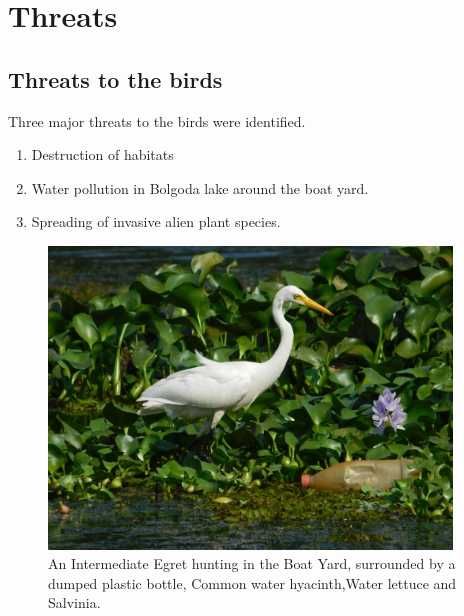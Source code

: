 \chapter{Threats}
\section{Threats to the birds}
 Three major threats  to the birds were identified.
\begin{enumerate}
    \item Destruction of habitats
    \item Water pollution in Bolgoda lake around the boat yard.
    \item Spreading of invasive alien plant species.
\end{enumerate}
\begin{figure}[!htpb]
    \centering
    \includegraphics[width=0.955\textwidth]{Figures/threats.jpg}
    \caption[]{An Intermediate Egret hunting in the Boat Yard, surrounded by a dumped plastic bottle, Common water hyacinth,Water lettuce and Salvinia.}
    \label{fig:figure-01}
\end{figure}
